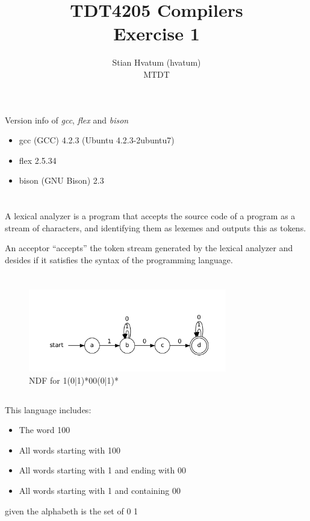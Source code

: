 \documentclass{article}
\title{TDT4205 Compilers\\
\Huge Exercise 1}
\author{Stian Hvatum (hvatum)\\MTDT}
\begin{document}
\maketitle

\section{}
Version info of \emph{gcc}, \emph{flex} and \emph{bison}
\begin{itemize}
  \item gcc (GCC) 4.2.3 (Ubuntu 4.2.3-2ubuntu7)
  \item flex 2.5.34
  \item bison (GNU Bison) 2.3
\end{itemize}


\section{}
A lexical analyzer is a program that accepts the source code of a program as a
stream of characters, and identifying them as lexemes and outputs this as
tokens.

An acceptor ``accepts'' the token stream generated by the lexical analyzer
and desides if it satisfies the syntax of the programming language.
\newpage
\section{}
\subsection{}
\begin{figure}[h]
\includegraphics[width=327px]{NDFA31.pdf}
\caption{NDF for 1(0|1)*00(0|1)*}
\end{figure}

\subsection{}
This language includes:
\begin{itemize}
  \item The word 100
  \item All words starting with 100
  \item All words starting with 1 and ending with 00
  \item All words starting with 1 and containing 00
\end{itemize}
given the alphabeth is the set of {0 1}
\end{document}
